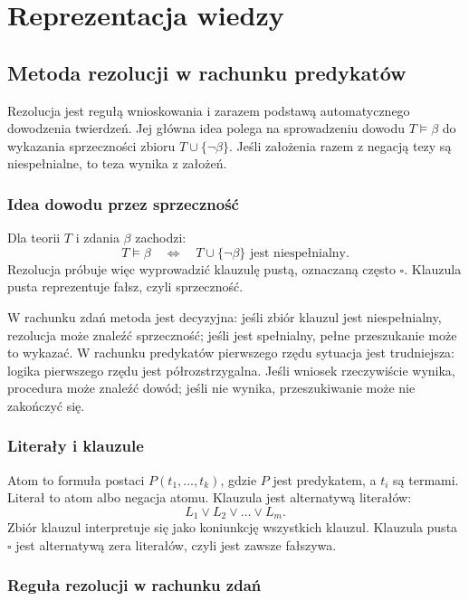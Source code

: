 \section{Reprezentacja wiedzy}

\subsection{Metoda rezolucji w rachunku predykatów}

Rezolucja jest regułą wnioskowania i zarazem podstawą automatycznego dowodzenia twierdzeń. Jej główna idea polega na sprowadzeniu dowodu $T\models \beta$ do wykazania sprzeczności zbioru $T\cup\{\neg\beta\}$. Jeśli założenia razem z negacją tezy są niespełnialne, to teza wynika z założeń.

\subsubsection{Idea dowodu przez sprzeczność}

Dla teorii $T$ i zdania $\beta$ zachodzi:
\[
T\models \beta \quad\Longleftrightarrow\quad T\cup\{\neg\beta\}\text{ jest niespełnialny}.
\]
Rezolucja próbuje więc wyprowadzić klauzulę pustą, oznaczaną często $\square$. Klauzula pusta reprezentuje fałsz, czyli sprzeczność.

W rachunku zdań metoda jest decyzyjna: jeśli zbiór klauzul jest niespełnialny, rezolucja może znaleźć sprzeczność; jeśli jest spełnialny, pełne przeszukanie może to wykazać. W rachunku predykatów pierwszego rzędu sytuacja jest trudniejsza: logika pierwszego rzędu jest półrozstrzygalna. Jeśli wniosek rzeczywiście wynika, procedura może znaleźć dowód; jeśli nie wynika, przeszukiwanie może nie zakończyć się.

\subsubsection{Literały i klauzule}

Atom to formuła postaci $P(t_1,\dots,t_k)$, gdzie $P$ jest predykatem, a $t_i$ są termami. Literał to atom albo negacja atomu. Klauzula jest alternatywą literałów:
\[
L_1\vee L_2\vee\dots\vee L_m.
\]
Zbiór klauzul interpretuje się jako koniunkcję wszystkich klauzul. Klauzula pusta $\square$ jest alternatywą zera literałów, czyli jest zawsze fałszywa.

\subsubsection{Reguła rezolucji w rachunku zdań}

